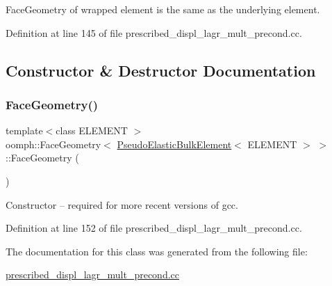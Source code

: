 Face\+Geometry of wrapped element is the same as the underlying element. 

Definition at line 145 of file prescribed\+\_\+displ\+\_\+lagr\+\_\+mult\+\_\+precond.\+cc.



\subsection{Constructor \& Destructor Documentation}
\mbox{\label{classoomph_1_1FaceGeometry_3_01PseudoElasticBulkElement_3_01ELEMENT_01_4_01_4_a3f79ef40a41543c9d96ef84aecc202f3}} 
\subsubsection{\texorpdfstring{Face\+Geometry()}{FaceGeometry()}}
{\footnotesize\ttfamily template$<$class E\+L\+E\+M\+E\+NT $>$ \\
oomph\+::\+Face\+Geometry$<$ \hyperlink{classoomph_1_1PseudoElasticBulkElement}{Pseudo\+Elastic\+Bulk\+Element}$<$ E\+L\+E\+M\+E\+NT $>$ $>$\+::Face\+Geometry (\begin{DoxyParamCaption}{ }\end{DoxyParamCaption})\hspace{0.3cm}{\ttfamily [inline]}}



Constructor -- required for more recent versions of gcc. 



Definition at line 152 of file prescribed\+\_\+displ\+\_\+lagr\+\_\+mult\+\_\+precond.\+cc.



The documentation for this class was generated from the following file\+:\begin{DoxyCompactItemize}
\item 
\hyperlink{prescribed__displ__lagr__mult__precond_8cc}{prescribed\+\_\+displ\+\_\+lagr\+\_\+mult\+\_\+precond.\+cc}\end{DoxyCompactItemize}
